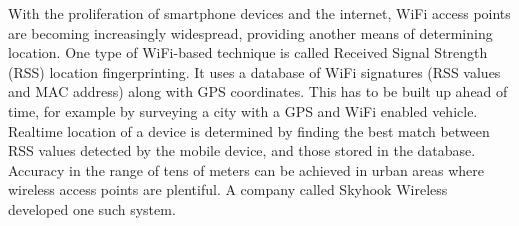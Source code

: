 

%



With the proliferation of smartphone devices and the internet,
WiFi access points are becoming increasingly widespread, 
providing another means of determining location. One type of WiFi-based technique is called Received Signal Strength (RSS) location fingerprinting. It uses a database of WiFi signatures (RSS values and MAC address) along with GPS coordinates. This has to be built up ahead of time, for example by surveying a city with a GPS and WiFi enabled vehicle. Realtime location of a device is determined by finding the best match between RSS values detected by the mobile device, and those stored in the database. Accuracy in the range of tens of meters can be achieved in urban areas where wireless access points are plentiful. A company called Skyhook Wireless developed one such system. \cite{Skyhook}


